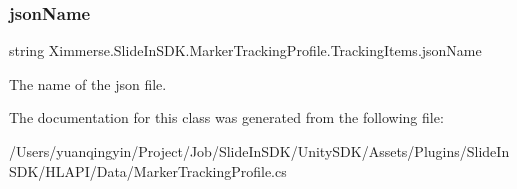 \subsubsection{\texorpdfstring{json\+Name}{jsonName}}
{\footnotesize\ttfamily string Ximmerse.\+Slide\+In\+S\+D\+K.\+Marker\+Tracking\+Profile.\+Tracking\+Items.\+json\+Name}



The name of the json file. 



The documentation for this class was generated from the following file\+:\begin{DoxyCompactItemize}
\item 
/\+Users/yuanqingyin/\+Project/\+Job/\+Slide\+In\+S\+D\+K/\+Unity\+S\+D\+K/\+Assets/\+Plugins/\+Slide\+In\+S\+D\+K/\+H\+L\+A\+P\+I/\+Data/Marker\+Tracking\+Profile.\+cs\end{DoxyCompactItemize}
